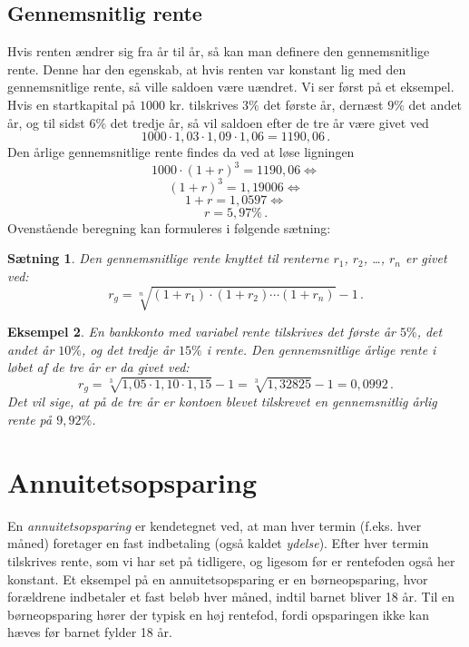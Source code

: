 \documentclass[12pt,oneside,a4paper]{article}
\newtheorem{thm}{Sætning}[section]
\newtheorem{eks}[thm]{Eksempel}
\begin{document}
\subsection{Gennemsnitlig rente}
Hvis renten ændrer sig fra år til år, så kan man definere den gennemsnitlige
rente. Denne har den egenskab, at hvis renten var konstant lig med den
gennemsnitlige rente, så ville saldoen være uændret.  Vi ser først på et
eksempel. Hvis en startkapital på $1000$ kr. tilskrives $3\%$ det første år,
dernæst $9\%$ det andet år, og til sidst $6\%$ det tredje år, så vil saldoen
efter de tre år være givet ved
\[
    1000\cdot 1,03 \cdot 1,09 \cdot 1,06 = 1190,06\,.
\]
Den årlige gennemsnitlige rente findes da ved at løse ligningen
\[
    1000\cdot (1+r)^3 = 1190,06 \Leftrightarrow 
\]
\[
    (1+r)^3=1,19006 \Leftrightarrow
\]
\[
    1+r = 1,0597 \Leftrightarrow
\]
\[
    r = 5,97\%\,.
\]
Ovenstående beregning kan formuleres i følgende sætning:
\begin{tcolorbox}
\begin{thm}
    Den gennemsnitlige rente knyttet til renterne $r_1$, $r_2$, \ldots, $r_n$
    er givet ved:
    \[
        r_g = \sqrt[n]{(1+r_1)\cdot(1+r_2)\cdots(1+r_n)}-1 \,.
    \]
\end{thm}
\end{tcolorbox}
\begin{tcolorbox}
\begin{eks}
    En bankkonto med variabel rente tilskrives det første år $5\%$, det andet
    år $10\%$, og det tredje år $15\%$ i rente. Den gennemsnitlige årlige rente
    i løbet af de tre år er da givet ved:
    \[
        r_g = \sqrt[3]{1,05\cdot1,10\cdot1,15}-1 = \sqrt[3]{1,32825}-1 = 0,0992\,.
    \]
Det vil sige, at på de tre år er kontoen blevet tilskrevet en gennemsnitlig
    årlig rente på $9,92\%$.
\end{eks}
\end{tcolorbox}


\section{Annuitetsopsparing}
En \emph{annuitetsopsparing} er kendetegnet ved, at man hver termin (f.eks. hver
måned) foretager en fast indbetaling (også kaldet \emph{ydelse}). Efter hver
termin tilskrives rente, som vi har set på tidligere, og ligesom før er
rentefoden også her konstant. Et eksempel på en annuitetsopsparing er en
børneopsparing, hvor forældrene indbetaler et fast beløb hver måned, indtil
barnet bliver 18 år. Til en børneopsparing hører der typisk en høj rentefod,
fordi opsparingen ikke kan hæves før barnet fylder 18 år.
\end{document}
